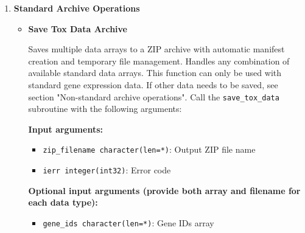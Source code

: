 \begin{enumerate}
\begin{enumerate}
            \item \textbf{Implementation Notes}
                  
                  \begin{itemize}
                    \item All routines are implemented in standard Fortran for interoperability
                          
                    \item The module uses allocatable arrays for flexible memory management
                          
                    \item File operations use Fortran's native unformatted I/O for efficiency
                          
                    \item Error handling is consistent across all functions for predictable
                          behavior
                  \end{itemize}
          \end{enumerate}
          
    \item \textbf{Standard Archive Operations}
          \begin{itemize}
            \item \textbf{Save Tox Data Archive}
                  
                  Saves multiple data arrays to a ZIP archive with automatic manifest creation
                  and temporary file management. Handles any combination of available
                  standard data arrays. This function can only be used with standard gene
                  expression data. If other data needs to be saved, see section "Non-standard
                  archive operations". Call the \texttt{save\_tox\_data} subroutine with
                  the following arguments:
                  
                  \textbf{Input arguments:}
                  \begin{itemize}
                    \item \texttt{zip\_filename character(len=*)}: Output ZIP file name
                          
                    \item \texttt{ierr integer(int32)}: Error code
                  \end{itemize}
                  \textbf{Optional input arguments (provide both array and filename for each
                  data type):}
                  \begin{itemize}
                    \item \texttt{gene\_ids character(len=*)}: Gene IDs array
                          

\end{itemize}
\end{itemize}
\end{enumerate}
